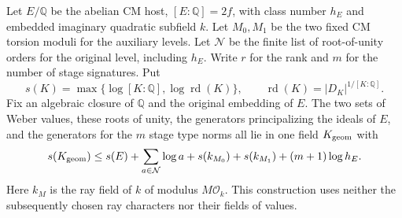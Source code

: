 \begin{auxlemma}\label{lem:marked-original-geometric-field}
Let \(E/\mathbb Q\) be the abelian CM host, \([E:\mathbb Q]=2f\),
with class number \(h_E\) and embedded imaginary quadratic
subfield \(k\). Let \(M_0,M_1\) be the two fixed CM torsion
moduli for the auxiliary levels. Let \(\mathcal N\) be the finite
list of root-of-unity orders for the original level, including
\(h_E\). Write \(r\) for the rank and \(m\) for the number
of stage signatures. Put
\[
   s(K)=\max\{\log[K:\mathbb Q],\log\operatorname{rd}(K)\},
   \qquad \operatorname{rd}(K)=|D_K|^{1/[K:\mathbb Q]} .
\]
Fix an algebraic closure of \(\mathbb Q\) and the original embedding
of \(E\). The two sets of Weber values, these roots of unity, the
generators principalizing the ideals of \(E\), and the generators for
the \(m\) stage type norms all lie in one field \(K_{\rm geom}\) with
\[
 s(K_{\rm geom})\le s(E)+\sum_{a\in\mathcal N}\log a
       +s(k_{M_0})+s(k_{M_1})+(m+1)\log h_E .
\]
Here \(k_M\) is the ray field of \(k\) of modulus \(M\mathcal O_k\).
This construction uses neither the subsequently chosen ray characters
nor their fields of values.
\end{auxlemma}
